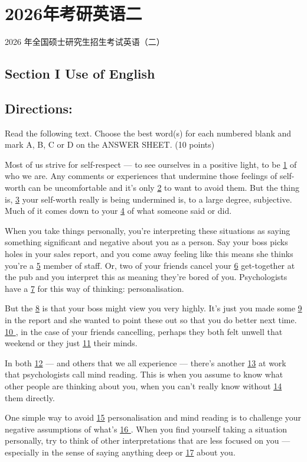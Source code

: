 \documentclass[UTF8,11pt]{ctexart}
\begin{document}
\section*{2026年考研英语二}
2026 年全国硕士研究生招生考试英语（二）


\subsection*{\textbf{Section I Use of English}}


\subsection*{\textbf{Directions:}}


Read the following text. Choose the best word(s) for each numbered blank and mark A, B, C or D on the ANSWER SHEET. (10 points)


Most of us strive for self-respect — to see ourselves in a positive light, to be \uline{1} of who we are. Any comments or experiences that undermine those feelings of self-worth can be uncomfortable and it’s only \uline{2} to want to avoid them. But the thing is, \uline{3} your self-worth really is being undermined is, to a large degree, subjective. Much of it comes down to your \uline{4} of what someone said or did.


When you take things personally, you’re interpreting these situations as saying something significant and negative about you as a person. Say your boss picks holes in your sales report, and you come away feeling like this means she thinks you’re a \uline{5} member of staff. Or, two of your friends cancel your \uline{6} get-together at the pub and you interpret this as meaning they’re bored of you. Psychologists have a \uline{7} for this way of thinking: personalisation.


But the \uline{8} is that your boss might view you very highly. It’s just you made some \uline{9} in the report and she wanted to point these out so that you do better next time. \uline{10 }, in the case of your friends cancelling, perhaps they both felt unwell that weekend or they just \uline{11} their minds.


In both \uline{12} — and others that we all experience — there’s another \uline{13} at work that psychologists call mind reading. This is when you assume to know what other people are thinking about you, when you can’t really know without \uline{14} them directly.


One simple way to avoid \uline{15} personalisation and mind reading is to challenge your negative assumptions of what’s \uline{16 }. When you find yourself taking a situation personally, try to think of other interpretations that are less focused on you — especially in the sense of saying anything deep or \uline{17} about you.
\end{document}
